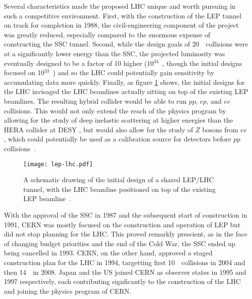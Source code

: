Several characteristics made the proposed LHC unique and worth pursuing in such a competitive environment. First, with the construction of the LEP tunnel on track for completion in 1988, the civil-engineering component of the project was greatly reduced, especially compared to the enormous expense of constructing the SSC tunnel. Second, while the design goals of 20~\TeV~collisions were at a significantly lower energy than the SSC, the projected luminosity was eventually designed to be a factor of 10 higher (10$^{34}$~\lumirate, though the initial designs focused on 10$^{33}$~\lumirate) and so the LHC could potentially gain sensitivity by accumulating data more quickly. Finally, as figure \ref{fig:lhc:lep-lhc} shows, the initial designs for the LHC invisaged the LHC beamlines actually sitting on top of the existing LEP beamlines. The resulting hybrid collider would be able to run $pp$, $ep$, and $ee$ collisions. This would not only extend the reach of the physics program by allowing for the study of deep inelastic scattering at higher energies than the HERA collider at DESY , but would also allow for the study of $Z$ bosons from $ee$, which could potentially be used as a calibration source for detectors before $pp$ collisions~\cite{ECFA1984}.


\begin{figure}
\centering
\texttt{[image: lep-lhc.pdf]}
\label{fig:lhc:lep-lhc}
\caption{A schematic drawing of the initial design of a shared LEP/LHC tunnel, with the LHC beamline positioned on top of the existing LEP beamline~\cite{ECFA1984}.}
\end{figure}


With the approval of the SSC in 1987 and the subsequent start of construction in 1991, CERN was mostly focused on the construction and operation of LEP but did not stop planning for the LHC. This proved remarkly prescient, as in the face of changing budget priorities and the end of the Cold War, the SSC ended up being cancelled in 1993.  CERN, on the other hand, approved a staged construction plan for the LHC in 1994, targetting first 10~\TeV~collisions in 2004 and then 14~\TeV~in 2008. Japan and the US joined CERN as observer states in 1995 and 1997 respectively, each contributing signficantly to the construction of the LHC and joining the physics program of CERN.


